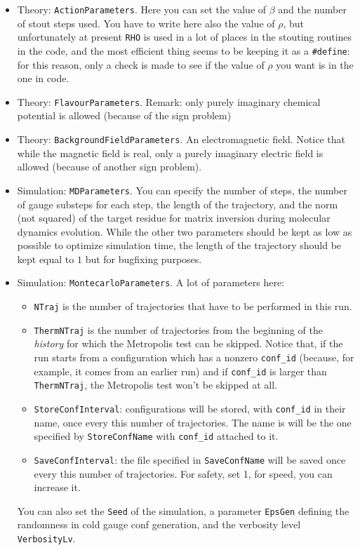 \documentclass[a4paper,10pt]{book}
\begin{document}
 \begin{itemize}
  \item{Theory: \verb|ActionParameters|.}
  Here you can set the value of $\beta$ and the number of stout steps used. You 
have to write here also the value of $\rho$, but unfortunately at present 
\verb|RHO| is used in a lot of places in the stouting routines in the code, and 
the most efficient thing seems to be keeping it as a \verb|#define|: for this 
reason, only a check is made to see if the value of $\rho$ you want is in 
the one in code.
  \item{Theory: \verb|FlavourParameters|.}
  Remark: only purely imaginary chemical potential is allowed (because of the 
sign problem)
  \item{Theory: \verb|BackgroundFieldParameters|.}
  An electromagnetic field. Notice that while the magnetic field is real, only 
a purely imaginary electric field is allowed (because of another sign problem).
  \item{Simulation: \verb|MDParameters|.} You can specify the number of steps, 
the number of gauge substeps for each step, the length of the trajectory, and 
the norm (not squared) of the target residue for matrix inversion during 
molecular dynamics evolution. While the other two parameters should be kept as 
low as possible to optimize simulation time, the length of the trajectory 
should be kept equal to $1$ but for bugfixing purposes.

  \item{Simulation: \verb|MontecarloParameters|.} A lot of parameters here: 
\begin{itemize}
 \item \verb|NTraj| is the number of trajectories that have to be performed in 
this run.
\item \verb|ThermNTraj| is the number of trajectories from the beginning of the 
\emph{history} for which the Metropolis test can be skipped. Notice that, if 
the run starts from a configuration which has a nonzero \verb|conf_id| 
(because, for example, it comes from an earlier run) and if \verb|conf_id| is 
larger than \verb|ThermNTraj|, the Metropolis test won't be skipped at all.
\item \verb|StoreConfInterval|: configurations will be stored, with 
\verb|conf_id| in their name, once every this number of trajectories. The name 
is will be the one specified by \verb|StoreConfName| with \verb|conf_id| 
attached to it. 
\item \verb|SaveConfInterval|: the file specified in \verb|SaveConfName| will 
be saved once every this number of trajectories. For safety, set 1, for speed, 
you can increase it.
\end{itemize}
You can also set the \verb|Seed| of the simulation, a parameter 
\verb|EpsGen| defining the randomness in cold gauge conf generation, and the 
verbosity level \verb|VerbosityLv|.
  

\end{itemize}
\end{document}
